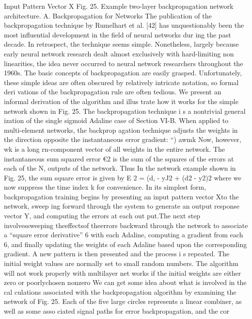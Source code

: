 \documentclass[11pt,a4paper,twocolumn]{article}
\begin{document}
{{Input 
Pattern 
Vector 
X 
Fig. 25. Example two-layer backpropagation network architecture. 
A. Backpropagation for Networks 
The publication of the backpropagation technique by 
Rumelhart et al. [42] has unquestionably been the most 
influential development in the field of neural networks dur
ing the past decade. In retrospect, the technique seems 
simple. Nonetheless, largely because early neural network 
research dealt almost exclusively with hard-limiting non
linearities, the idea never occurred to neural network 
researchers throughout the 1960s. 
The basic concepts of backpropagation are easily 
grasped. Unfortunately, these simple ideas are often 
obscured by relatively intricate notation, so formal deri
vations of the backpropagation rule are often tedious. We 
present an informal derivation of the algorithm and illus
trate how it works for the simple network shown in Fig. 25. 
The backpropagation technique i s  a nontrivial general
ization of the single sigmoid Adaline case of Section VI-B. 
When applied to multi-element networks, the backprop
agation technique adjusts the weights in the direction 
opposite the instantaneous error gradient: 
“) 
awmk 
Now, however, wk is a long rn-component vector of all 
weights in the entire network. The instantaneous sum 
squared error €2 is the sum of the squares of the errors at 
each of the N, outputs of the network. Thus 
In the network example shown in Fig. 25, the sum square 
error is given by 
E 2  = (d, - yJ2 + (d2 - y2)2 
where we now suppress the time index k for convenience. 
In its simplest form, backpropagation training begins by 
presenting an input pattern vector Xto the network, sweep
ing forward through the system to generate an output 
response vector Y, and computing the errors at each out
put.The next step involvessweeping theeffectsof theerrors 
backward through the network to associate a “square error 
derivative” 6 with each Adaline, computing a gradient from 
each 6, and finally updating the weights of each Adaline 
based upon the corresponding gradient. A new pattern is 
then presented and the process i s  repeated. The initial 
weight values are normally set to small random numbers. 
The algorithm will not work properly with multilayer net
works if the initial weights are either zero or poorlychosen 
nonzero 
We can get some idea about what is involved in the cal
culations associated with the backpropagation algorithm 
by examining the network of Fig. 25. Each of the five large 
circles represents a linear combiner, as well as some asso
ciated signal paths for error backpropagation, and the cor
}}
\end{document}
